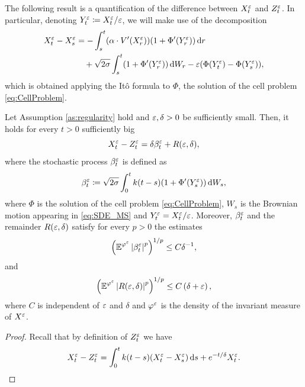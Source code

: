 \documentclass[10pt]{article}
\begin{document}
\begin{appendices}
The following result is a quantification of the difference between $X^\varepsilon_t$ and $Z^\varepsilon_t$. In particular, denoting $Y_t^\varepsilon \coloneqq X_t^\varepsilon/\varepsilon$, we will make use of the decomposition
\cite[Formula 5.8]{PaS07}
\begin{equation}\label{eq:App_DiffXtXs}
\begin{aligned}
	X_t^\varepsilon - X_s^\varepsilon &= -\int_s^t (\alpha \cdot V'(X_r^\varepsilon))(1 + \Phi'(Y^\varepsilon_r)) \,\mathrm{d} r\\
	&\quad +\sqrt{2\sigma} \int_s^t (1 + \Phi'(Y_r^\varepsilon)) \,\mathrm{d} W_r - \varepsilon(\Phi(Y^\varepsilon_t)-\Phi(Y^\varepsilon_s)),
\end{aligned}
\end{equation}
which is obtained applying the Itô formula to $\Phi$, the solution of the cell problem \eqref{eq:CellProblem}. 

\begin{lemma} \label{lem:zeta} Let Assumption \ref{as:regularity} hold and $\varepsilon,\delta>0$ be sufficiently small. Then, it holds for every $t > 0$ sufficiently big 
	\begin{equation}
		X_t^\varepsilon - Z_t^\varepsilon = \delta \beta^\varepsilon_t + R(\varepsilon,\delta),
	\end{equation}
	where the stochastic process $\beta_t^\varepsilon$ is defined as
	\begin{equation}\label{eq:defBeta}
		\beta_t^\varepsilon \coloneqq \sqrt{2\sigma} \int_0^t k(t-s)(1 + \Phi'(Y_s^\varepsilon)) \,\mathrm{d} W_s,
	\end{equation}
	where $\Phi$ is the solution of the cell problem \eqref{eq:CellProblem}, $W_s$ is the Brownian motion appearing in \eqref{eq:SDE_MS} and $Y_t^\varepsilon = X_t^\varepsilon / \varepsilon$. Moreover, $\beta_t^\varepsilon$ and the remainder $R(\varepsilon,\delta)$ satisfy for every $p > 0$ the estimates
	\begin{equation} \label{eq:beta}
	\left( \operatorname{\mathbb{E}}^{\varphi^\varepsilon} \left\lvert\beta_t^\varepsilon\right\rvert^p \right)^{1/p} \leq C \delta^{-1},
	\end{equation}
	and
	\begin{equation} \label{eq:remainder_zeta}
	\left( \operatorname{\mathbb{E}}^{\varphi^\varepsilon} \left| R(\varepsilon,\delta) \right|^p \right)^{1/p} \le C \left( \delta + \varepsilon \right),
	\end{equation}
	where $C$ is independent of $\varepsilon$ and $\delta$ and $\varphi^\varepsilon$ is the density of the invariant measure of $X^\varepsilon$.
\end{lemma}
\begin{proof} Recall that by definition of $Z_t^\varepsilon$ we have
	\begin{equation}
	X_t^\epl - Z_t^\epl = \int_0^t k(t-s) (X_t^\epl - X_s^\epl) \dd s + e^{-t/\delta}X_t^\epl.

\end{equation}
\end{proof}
\end{appendices}
\end{document}
